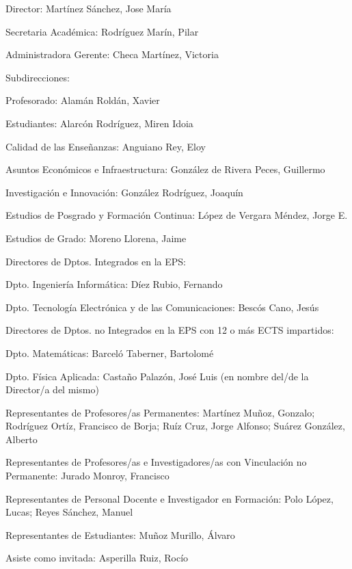 \documentclass[numerado]{plantillasEPS} %
\begin{document}
\begin{asisten}
    \item[Director:] Martínez Sánchez, Jose María
    \item[Secretaria Académica:] Rodríguez Marín, Pilar
    \item[Administradora Gerente:] Checa Martínez, Victoria
    
    \item[Subdirecciones:] 
    \begin{asisten}
        \item[Profesorado:] Alamán Roldán, Xavier
        \item[Estudiantes:] Alarcón Rodríguez, Miren Idoia
        \item[Calidad de las Enseñanzas:] Anguiano Rey, Eloy
        \item[Asuntos Económicos e Infraestructura:] González de Rivera Peces, Guillermo
        \item[Investigación e Innovación:] González Rodríguez, Joaquín
        \item[Estudios de Posgrado y Formación Continua:] López de Vergara Méndez, Jorge E.
        \item[Estudios de Grado:] Moreno Llorena, Jaime
    \end{asisten} 
    \item[Directores de Dptos. Integrados en la EPS:] 
    \begin{asisten}
        \item[Dpto. Ingeniería Informática:] Díez Rubio, Fernando
        \item[Dpto. Tecnología Electrónica y de las Comunicaciones:] Bescós Cano, Jesús
    \end{asisten} 
    \item[Directores de Dptos. no Integrados en la EPS con 12 o más ECTS impartidos:] 
    \begin{asisten}
        \item[Dpto. Matemáticas:] Barceló Taberner, Bartolomé
        \item[Dpto. Física Aplicada:] Castaño Palazón, José Luis (en nombre del/de la Director/a del mismo)
    \end{asisten} 
    \item[Representantes de Profesores/as Permanentes:] 
    Martínez Muñoz, Gonzalo; Rodríguez Ortíz, Francisco de Borja; Ruíz Cruz, Jorge Alfonso; Suárez González, Alberto
    \item[Representantes de Profesores/as e Investigadores/as con Vinculación no  Permanente:] Jurado Monroy, Francisco
    \item[Representantes de Personal Docente e Investigador en Formación:] Polo López, Lucas; Reyes Sánchez, Manuel
    \item[Representantes de Estudiantes:] Muñoz Murillo, Álvaro
    \item[Asiste como invitada:] Asperilla Ruiz, Rocío
\end{asisten}
\end{document}
